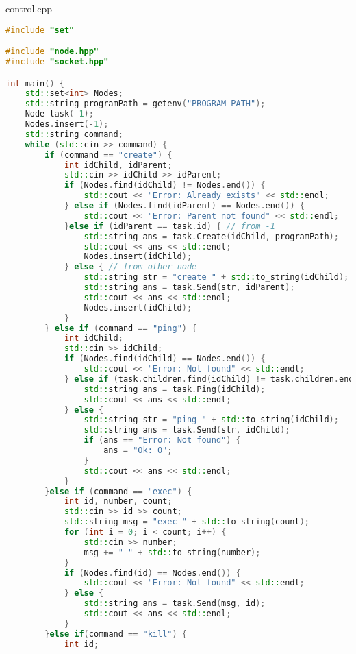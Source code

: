 \documentclass[a4paper, 12pt]{article}
\begin{document}
control.cpp
\begin{lstlisting}[language=C++]
#include "set"

#include "node.hpp"
#include "socket.hpp"

int main() {
    std::set<int> Nodes;
    std::string programPath = getenv("PROGRAM_PATH");
    Node task(-1);
    Nodes.insert(-1);
    std::string command;
    while (std::cin >> command) {
        if (command == "create") {
            int idChild, idParent;
            std::cin >> idChild >> idParent;
            if (Nodes.find(idChild) != Nodes.end()) {
                std::cout << "Error: Already exists" << std::endl;
            } else if (Nodes.find(idParent) == Nodes.end()) {
                std::cout << "Error: Parent not found" << std::endl;
            }else if (idParent == task.id) { // from -1
                std::string ans = task.Create(idChild, programPath);
                std::cout << ans << std::endl;
                Nodes.insert(idChild);
            } else { // from other node
                std::string str = "create " + std::to_string(idChild);
                std::string ans = task.Send(str, idParent);
                std::cout << ans << std::endl;
                Nodes.insert(idChild);
            }   
        } else if (command == "ping") {
            int idChild;
            std::cin >> idChild;
            if (Nodes.find(idChild) == Nodes.end()) {
                std::cout << "Error: Not found" << std::endl;
            } else if (task.children.find(idChild) != task.children.end()) {
                std::string ans = task.Ping(idChild);
                std::cout << ans << std::endl;
            } else {
                std::string str = "ping " + std::to_string(idChild);
                std::string ans = task.Send(str, idChild);
                if (ans == "Error: Not found") {
                    ans = "Ok: 0";
                }
                std::cout << ans << std::endl;
            }
        }else if (command == "exec") {
            int id, number, count;
            std::cin >> id >> count;
            std::string msg = "exec " + std::to_string(count); 
            for (int i = 0; i < count; i++) {
                std::cin >> number;
                msg += " " + std::to_string(number);
            }
            if (Nodes.find(id) == Nodes.end()) {
                std::cout << "Error: Not found" << std::endl;
            } else {
                std::string ans = task.Send(msg, id);
                std::cout << ans << std::endl;
            }
        }else if(command == "kill") {
            int id;

\end{lstlisting}
\end{document}
